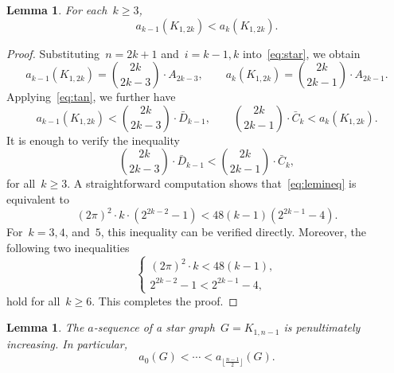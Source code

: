 \documentclass[10pt]{amsart}
\theoremstyle{plain}
\newtheorem{lemma}[theorem]{Lemma}
\numberwithin{equation}{section}
\theoremstyle{definition}
\begin{document}
\begin{lemma}\label{lemma:star1}
For each~$k \geq 3$,
$$
a_{k-1}(K_{1,2k})  < a_{k}(K_{1,2k}).
$$
\end{lemma}
\begin{proof}
Substituting~$n = 2k + 1$ and~$i = k - 1, k$ into~\eqref{eq:star}, we obtain
$$
a_{k-1}(K_{1,2k}) = \binom{2k}{2k-3} \cdot A_{2k-3},
\qquad
a_{k}(K_{1,2k}) = \binom{2k}{2k-1} \cdot A_{2k-1}.
$$
Applying~\eqref{eq:tan}, we further have
$$
a_{k-1}(K_{1,2k}) < \binom{2k}{2k-3} \cdot \bar{D}_{k-1},
\qquad
\binom{2k}{2k-1} \cdot \bar{C}_{k} < a_{k}(K_{1,2k}).
$$
It is enough to verify the inequality
\begin{equation}\label{eq:lemineq}
  \binom{2k}{2k-3} \cdot \bar{D}_{k-1} < \binom{2k}{2k-1} \cdot \bar{C}_{k},
\end{equation}
for all~$k \geq 3$.
A straightforward computation shows that~\eqref{eq:lemineq} is equivalent to
\begin{equation}\label{eq:le}
  (2\pi)^{2} \cdot k \cdot (2^{2k-2} - 1)  < 48(k-1)(2^{2k-1}-4).
\end{equation}
For~$k = 3, 4$, and~$5$, this inequality can be verified directly.
Moreover, the following two inequalities
$$
\begin{cases}
  (2\pi)^{2} \cdot k < 48(k-1),\\[2pt]
  2^{2k-2} - 1 < 2^{2k-1}-4,
\end{cases}
$$
hold for all~$k \geq 6$.
This completes the proof.
\end{proof}




\begin{lemma}\label{lemma:star2}
    The $a$-sequence of a star graph~$G = K_{1,n-1}$ is penultimately increasing.
    In particular,
    \begin{equation}\label{eq:lemeq}
      a_0(G) < \cdots < a_{\lfloor \frac{n-1}{2}\rfloor}(G).
    \end{equation}
\end{lemma}
\end{document}

